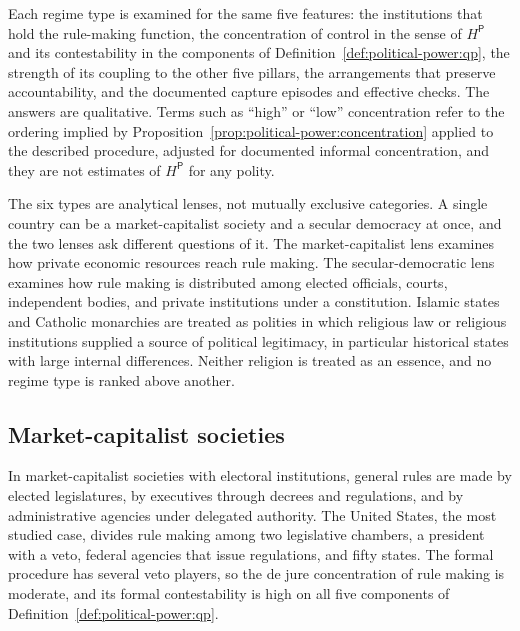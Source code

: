 \documentclass[11pt,letterpaper]{article}
\theoremstyle{definition}
\theoremstyle{remark}
\newcommand{\pP}{\mathsf{P}}
\begin{document}
Each regime type is examined for the same five features: the institutions that hold the rule-making function, the concentration of control in the sense of $H^{\pP}$ and its contestability in the components of Definition~\ref{def:political-power:qp}, the strength of its coupling to the other five pillars, the arrangements that preserve accountability, and the documented capture episodes and effective checks. The answers are qualitative. Terms such as ``high'' or ``low'' concentration refer to the ordering implied by Proposition~\ref{prop:political-power:concentration} applied to the described procedure, adjusted for documented informal concentration, and they are not estimates of $H^{\pP}$ for any polity.

The six types are analytical lenses, not mutually exclusive categories. A single country can be a market-capitalist society and a secular democracy at once, and the two lenses ask different questions of it. The market-capitalist lens examines how private economic resources reach rule making. The secular-democratic lens examines how rule making is distributed among elected officials, courts, independent bodies, and private institutions under a constitution. Islamic states and Catholic monarchies are treated as polities in which religious law or religious institutions supplied a source of political legitimacy, in particular historical states with large internal differences. Neither religion is treated as an essence, and no regime type is ranked above another.

\subsection{Market-capitalist societies}

In market-capitalist societies with electoral institutions, general rules are made by elected legislatures, by executives through decrees and regulations, and by administrative agencies under delegated authority. The United States, the most studied case, divides rule making among two legislative chambers, a president with a veto, federal agencies that issue regulations, and fifty states. The formal procedure has several veto players, so the de jure concentration of rule making is moderate, and its formal contestability is high on all five components of Definition~\ref{def:political-power:qp}.
\end{document}
